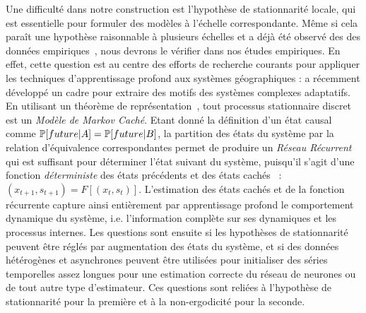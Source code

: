 {Une difficulté dans notre construction est l'hypothèse de stationnarité locale, qui est essentielle pour formuler des modèles à l'échelle correspondante. Même si cela paraît une hypothèse raisonnable à plusieurs échelles et a déjà été observé des des données empiriques~\cite{sanders1992systeme}, nous devrons le vérifier dans nos études empiriques. En effet, cette question est au centre des efforts de recherche courants pour appliquer les techniques d'apprentissage profond aux systèmes géographiques :  a récemment développé un cadre pour extraire des motifs des systèmes complexes adaptatifs. En utilisant un théorème de représentation~\cite{knight1975predictive}, tout processus stationnaire discret est un \emph{Modèle de Markov Caché}. Etant donné la définition d'un état causal comme $\operatorname{\mathbb{P}}\!\left[future | A\right] = \operatorname{\mathbb{P}}\!\left[future | B\right]$, la partition des états du système par la relation d'équivalence correspondantes permet de produire un \emph{Réseau Récurrent} qui est suffisant pour déterminer l'état suivant du système, puisqu'il s'agit d'une fonction \emph{déterministe} des états précédents et des états cachés~\cite{shalizi2001computational} : $(x_{t+1},s_{t+1}) = F\left[(x_t,s_t)\right]$. L'estimation des états cachés et de la fonction récurrente capture ainsi entièrement par apprentissage profond le comportement dynamique du système, i.e. l'information complète sur ses dynamiques et les processus internes. Les questions sont ensuite si les hypothèses de stationnarité peuvent être réglés par augmentation des états du système, et si des données hétérogènes et asynchrones peuvent être utilisées pour initialiser des séries temporelles assez longues pour une estimation correcte du réseau de neurones ou de tout autre type d'estimateur. Ces questions sont reliées à l'hypothèse de stationnarité pour la première et à la non-ergodicité pour la seconde.
}






\stars










